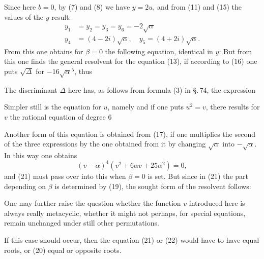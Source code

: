
Since here $b=0$, by (7) and (8) we have $y=2u$, and
from (11) and (15) the values of the $y$ result:
\[
\begin{aligned}
y_1&=y_2=y_3=y_6=-2\sqrt{\alpha}\\
y_4&=(4-2i)\sqrt{\alpha},\quad y_5=(4+2i)\sqrt{\alpha}.
\end{aligned}
\]
From this one obtains for $\beta=0$ the following equation,
identical in $y$:
But from this one finds the general resolvent for the
equation (13), if according to (16) one puts $\sqrt{\Delta}$ for $-16\sqrt{\alpha}^5$, thus

The discriminant $\Delta$ here has, as follows from formula (3)
in \S.\,74, the expression

Simpler still is the equation for $u$, namely
and if one puts $u^2=v$, there results for $v$ the rational
equation of degree 6

Another form of this equation is obtained from (17),
if one multiplies the second of the three expressions by the one
obtained from it by changing $\sqrt{\alpha}$ into $-\sqrt{\alpha}$.
In this way one obtains
\[
(v-\alpha)^4(v^2+6\alpha v+25\alpha^2)=0,
\]
and (21) must pass over into this when $\beta=0$ is set.
But since in (21) the part depending on $\beta$ is determined
by (19), the sought form of the resolvent follows:

One may further raise the question whether the function $v$
introduced here is always really metacyclic, whether it might not
perhaps, for special equations, remain unchanged under still
other permutations.

If this case should occur, then the equation
(21) or (22) would have to have equal roots, or (20) equal or
opposite roots.
